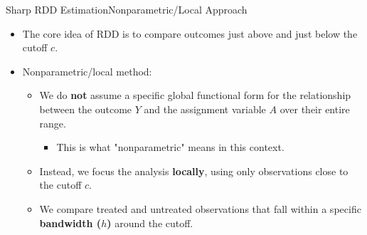 \documentclass[dvipsnames,hyperref={pdfpagelabels=false}]{beamer}
\begin{document}
\begin{frame}{Sharp RDD Estimation}{Nonparametric/Local Approach}
	\begin{itemize}

		\item The core idea of RDD is to compare outcomes just above and just below the cutoff $c$.
		\vspace{0.2cm}
		\item Nonparametric/local method:
		\vspace{0.2cm}
		\begin{itemize}
			\item We do \textbf{not} assume a specific global functional form for the relationship between the outcome $Y$ and the assignment variable $A$ over their entire range. 
						\vspace{0.2cm}
					\begin{itemize}
			\item This is what "nonparametric" means in this context.
			\vspace{0.2cm}
					\end{itemize}
			\item Instead, we focus the analysis \textbf{locally}, using only observations close to the cutoff $c$.
			\vspace{0.2cm}
			\item We compare treated and untreated observations that fall within a specific \textbf{bandwidth ($h$)} around the cutoff.
		\end{itemize}
		
	\end{itemize}
		
		

\end{frame}
\end{document}
